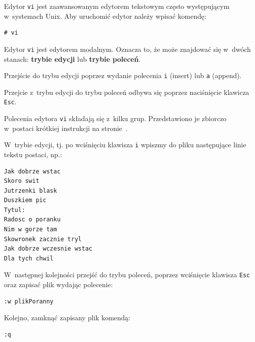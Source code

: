 \begin{example}\label{ex:vi} 


Edytor \lstinline[style=MyBashStyle]{vi} jest zaawansowanym edytorem tekstowym często występującym w~systemach Unix. Aby uruchomić edytor należy wpisać komendę: 

\begin{lstlisting}[style=MyBashStyle]
# vi
\end{lstlisting}

 Edytor \lstinline[style=MyBashStyle]{vi} jest edytorem modalnym. Oznacza to, że może znajdować się w~dwóch stanach: \textbf{trybie edycji} lub \textbf{trybie poleceń}. 
 
\begin{myitemize}
\item Przejście do trybu edycji poprzez wydanie polecenia \lstinline[style=MyBashStyle]{i} (insert) lub \lstinline[style=MyBashStyle]{a} (append).
\item Przejcie z~trybu edycji do trybu poleceń odbywa się poprzez naciśnięcie klawicza \lstinline[style=MyBashStyle]{Esc}. 
\end{myitemize}

Polecenia edytora \lstinline[style=MyBashStyle]{vi} składają się z~kilku grup. Przedstawiono je zbiorczo w~postaci krótkiej instrukcji na stronie~\pageref{viRef}.

W~trybie edycji, tj. po wciśnięciu klawisza \lstinline[style=MyBashStyle]{i} wpiszmy do pliku następujące linie tekstu postaci, np.: 


\begin{lstlisting}[style=MyBashStyle]
Jak dobrze wstac
Skoro swit
Jutrzenki blask
Duszkiem pic 
Tytul:
Radosc o poranku
Nim w gorze tam
Skowronek zacznie tryl
Jak dobrze wczesnie wstac
Dla tych chwil
\end{lstlisting}

W~następnej kolejności przejść do trybu poleceń, poprzez wciśnięcie klawisza \lstinline[style=MyBashStyle]{Esc} oraz zapisać plik wydając polecenie: 

\begin{lstlisting}[style=MyBashStyle]
:w plikPoranny
\end{lstlisting}

Kolejno, zamknąć zapisany plik komendą: 

\begin{lstlisting}[style=MyBashStyle]
:q
\end{lstlisting}


\end{example}
